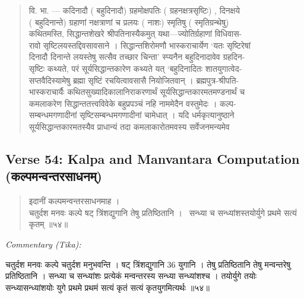 \documentclass[11pt,a4paper]{article}
\newcommand{\dev}[1]{{\devanagarifont #1}}
\newcommand{\skt}[1]{{\devanagarifont\color{sktcolor} #1}}
\newenvironment{shloka}{%
  \begin{quote}%
  \smallskip%
  \devanagarifont\color{sktcolor}%
}{%
  \smallskip%
  \end{quote}%
}
\newenvironment{tika}{%
  \smallskip%
  \noindent\textit{Commentary (Tika):}\par%
  \smallskip%
  \hindifont\small%
}{%
  \par\smallskip%
}
\begin{document}
\vspace{0.5cm}

\begin{shloka}
\skt{वि. भा. — कदिनादौ} (\skt{बहुदिनादौ}) \skt{ग्रहमोक्षपतिः} (\skt{ग्रहनक्षत्रसृष्टिः})\skt{, दिनक्षये}\\
(\skt{बहुदिनान्ते}) \skt{ग्रहाणां नक्षत्राणां च प्रलयः} (\skt{नाशः}) \skt{स्मृतिषु} (\skt{स्मृतिग्रन्थेषु})\\
\skt{कथितमस्ति, सिद्धान्तशेखरे श्रीपतिनास्यैकमुत् यथा—ज्योतिर्ग्रहाणां विधिवास-}\\
\skt{रावो सृष्टिलयस्तद्दिवसावसाने । सिद्धान्तशिरोमणौ भास्कराचार्येण `यतः सृष्टिरेषां}\\
\skt{दिनादौ दिनान्ते लयस्तेषु सत्सैव तच्छार चिन्ता' स्प्यनैन बहुदिनादावेव ग्रहदिन-}\\
\skt{सृष्टिः कथ्यते, परं सूर्यसिद्धान्तकारेण कथ्यते यत् `बहुदिनादितः शातयुगात्वेद-}\\
\skt{सप्तवैदिस्यामेषु ब्रह्मा सृष्टिं रचयित्वावसासै नियोजितवान् । ब्रह्मपुत्र-श्रीपति-}\\
\skt{भास्कराचार्यैः कथितसुख्यादिकालानिराकरणार्थं सूर्यसिद्धान्तकारमतमण्डनार्थं च}\\
\skt{कमलाकरेण सिद्धान्ततत्त्वविवेके बहुप्रपञ्चं नहि नाममेदैन वस्तुमेदः । कल्प-}\\
\skt{सम्बन्धमगणादीनां सृष्टिसम्बन्धमगणादीनां चामेधात् । यदि धर्मकृत्यानुष्ठाने}\\
\skt{सूर्यसिद्धान्तकारमतस्यैव प्राधान्यं तदा कमलाकारोतमवस्य सर्वेजनमन्यमेव}
\end{shloka}

\subsection*{Verse 54: Kalpa and Manvantara Computation (\dev{कल्पमन्वन्तरसाधनम्})}

\begin{shloka}
\skt{इदानीं कल्पमन्वन्तरसाधनमाह ।}\\[0.5em]
\skt{चतुर्दश मनवः कल्पे षट् त्रिंशद्युगानि तेषु प्रतिष्ठितानि ।}\
\skt{सन्ध्या च सन्ध्यांशस्तयोर्युगे प्रथमे सत्यं कृतम्} ॥५४॥
\end{shloka}

\vspace{0.3cm}
\begin{tika}
\skt{चतुर्दश मनवः} कल्पे चतुर्दश मनुभवन्ति । \skt{षट् त्रिंशद्युगानि} $36$ \skt{युगानि} । \skt{तेषु प्रतिष्ठितानि} तेषु मन्वन्तरेषु प्रतिष्ठितानि । \skt{सन्ध्या च सन्ध्यांशः} प्रत्येकं मन्वन्तरस्य सन्ध्या सन्ध्यांशश्च । \skt{तयोर्युगे} तयोः सन्ध्यासन्ध्यांशयोः युगे \skt{प्रथमे} प्रथमं \skt{सत्यं कृतं} सत्यं कृतयुगमित्यर्थः ॥५४॥
\end{tika}
\end{document}

